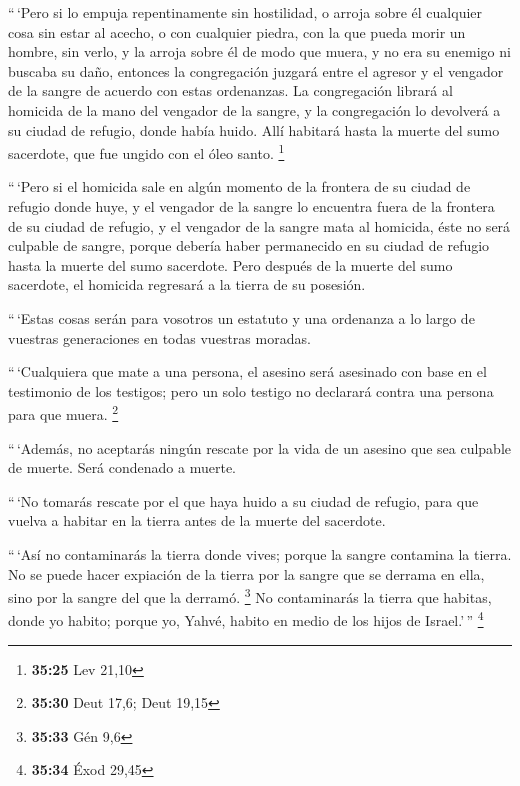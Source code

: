 \begin{paracol}{2}
 ``\,`Pero si lo empuja repentinamente sin hostilidad, o
arroja sobre él cualquier cosa sin estar al acecho,  o
con cualquier piedra, con la que pueda morir un hombre, sin verlo, y la
arroja sobre él de modo que muera, y no era su enemigo ni buscaba su
daño,  entonces la congregación juzgará entre el agresor
y el vengador de la sangre de acuerdo con estas ordenanzas.
 La congregación librará al homicida de la mano del
vengador de la sangre, y la congregación lo devolverá a su ciudad de
refugio, donde había huido. Allí habitará hasta la muerte del sumo
sacerdote, que fue ungido con el óleo santo. \footnote{\textbf{35:25}
  Lev 21,10}

 ``\,`Pero si el homicida sale en algún momento de la
frontera de su ciudad de refugio donde huye,  y el
vengador de la sangre lo encuentra fuera de la frontera de su ciudad de
refugio, y el vengador de la sangre mata al homicida, éste no será
culpable de sangre,  porque debería haber permanecido en
su ciudad de refugio hasta la muerte del sumo sacerdote. Pero después de
la muerte del sumo sacerdote, el homicida regresará a la tierra de su
posesión.

 ``\,`Estas cosas serán para vosotros un estatuto y una
ordenanza a lo largo de vuestras generaciones en todas vuestras moradas.

 ``\,`Cualquiera que mate a una persona, el asesino será
asesinado con base en el testimonio de los testigos; pero un solo
testigo no declarará contra una persona para que muera. \footnote{\textbf{35:30}
  Deut 17,6; Deut 19,15}

 ``\,`Además, no aceptarás ningún rescate por la vida de
un asesino que sea culpable de muerte. Será condenado a muerte.

 ``\,`No tomarás rescate por el que haya huido a su
ciudad de refugio, para que vuelva a habitar en la tierra antes de la
muerte del sacerdote.

 ``\,`Así no contaminarás la tierra donde vives; porque
la sangre contamina la tierra. No se puede hacer expiación de la tierra
por la sangre que se derrama en ella, sino por la sangre del que la
derramó. \footnote{\textbf{35:33} Gén 9,6}  No
contaminarás la tierra que habitas, donde yo habito; porque yo, Yahvé,
habito en medio de los hijos de Israel.'\,'' \footnote{\textbf{35:34}
  Éxod 29,45}

\switchcolumn
\begin{otherlanguage}{english}


\end{otherlanguage}
\end{paracol}
